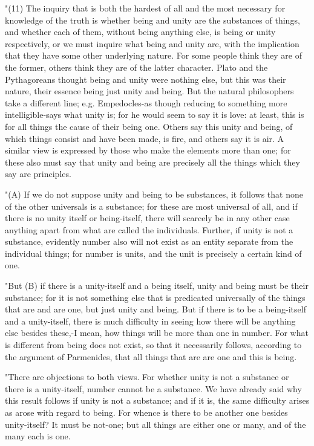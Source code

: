 "(11) The inquiry that is both the hardest of all and the most necessary
for knowledge of the truth is whether being and unity are the substances
of things, and whether each of them, without being anything else,
is being or unity respectively, or we must inquire what being and
unity are, with the implication that they have some other underlying
nature. For some people think they are of the former, others think
they are of the latter character. Plato and the Pythagoreans thought
being and unity were nothing else, but this was their nature, their
essence being just unity and being. But the natural philosophers take
a different line; e.g. Empedocles-as though reducing to something
more intelligible-says what unity is; for he would seem to say it
is love: at least, this is for all things the cause of their being
one. Others say this unity and being, of which things consist and
have been made, is fire, and others say it is air. A similar view
is expressed by those who make the elements more than one; for these
also must say that unity and being are precisely all the things which
they say are principles. 

"(A) If we do not suppose unity and being to be substances, it follows
that none of the other universals is a substance; for these are most
universal of all, and if there is no unity itself or being-itself,
there will scarcely be in any other case anything apart from what
are called the individuals. Further, if unity is not a substance,
evidently number also will not exist as an entity separate from the
individual things; for number is units, and the unit is precisely
a certain kind of one. 

"But (B) if there is a unity-itself and a being itself, unity and
being must be their substance; for it is not something else that is
predicated universally of the things that are and are one, but just
unity and being. But if there is to be a being-itself and a unity-itself,
there is much difficulty in seeing how there will be anything else
besides these,-I mean, how things will be more than one in number.
For what is different from being does not exist, so that it necessarily
follows, according to the argument of Parmenides, that all things
that are are one and this is being. 

"There are objections to both views. For whether unity is not a substance
or there is a unity-itself, number cannot be a substance. We have
already said why this result follows if unity is not a substance;
and if it is, the same difficulty arises as arose with regard to being.
For whence is there to be another one besides unity-itself? It must
be not-one; but all things are either one or many, and of the many
each is one. 

